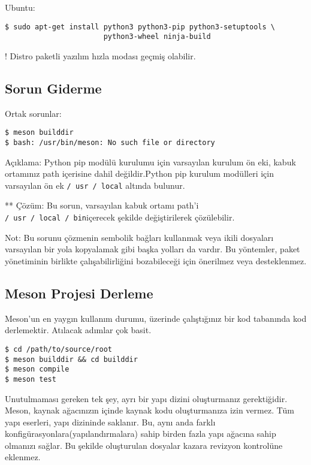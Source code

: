 \documentclass[
]{book}
\begin{document}
Ubuntu:

\begin{verbatim}
$ sudo apt-get install python3 python3-pip python3-setuptools \
                       python3-wheel ninja-build
\end{verbatim}

! Distro paketli yazılım hızla modası geçmiş olabilir.

\hypertarget{sorun-giderme}{%
\subsection{Sorun Giderme}\label{sorun-giderme}}

Ortak sorunlar:

\begin{verbatim}
$ meson builddir
$ bash: /usr/bin/meson: No such file or directory
\end{verbatim}

Açıklama: Python pip modülü kurulumu için varsayılan kurulum ön eki, kabuk ortamınız path içerisine dahil değildir.Python pip kurulum modülleri için varsayılan ön ek \texttt{/\ usr\ /\ local} altında bulunur.

** Çözüm: Bu sorun, varsayılan kabuk ortamı path'i \texttt{/\ usr\ /\ local\ /\ bin}içerecek şekilde değiştirilerek çözülebilir.

Not: Bu sorunu çözmenin sembolik bağları kullanmak veya ikili dosyaları varsayılan bir yola kopyalamak gibi başka yolları da vardır. Bu yöntemler, paket yönetiminin birlikte çalışabilirliğini bozabileceği için önerilmez veya desteklenmez.

\hypertarget{meson-projesi-derleme}{%
\subsection{Meson Projesi Derleme}\label{meson-projesi-derleme}}

Meson'un en yaygın kullanım durumu, üzerinde çalıştığınız bir kod tabanında kod derlemektir. Atılacak adımlar çok basit.

\begin{verbatim}
$ cd /path/to/source/root
$ meson builddir && cd builddir
$ meson compile
$ meson test
\end{verbatim}

Unutulmaması gereken tek şey, ayrı bir yapı dizini oluşturmanız gerektiğidir. Meson, kaynak ağacınızın içinde kaynak kodu oluşturmanıza izin vermez. Tüm yapı eserleri, yapı dizininde saklanır. Bu, aynı anda farklı konfigürasyonlara(yapılandırmalara) sahip birden fazla yapı ağacına sahip olmanızı sağlar. Bu şekilde oluşturulan dosyalar kazara revizyon kontrolüne eklenmez.
\end{document}
